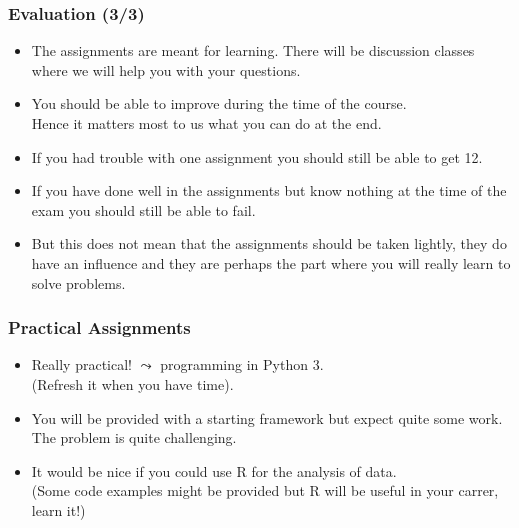 \documentclass[handout,usepdftitle=false,aspectratio=169,smaller,compress,sans,fleqn,xcolor=dvipsnames,fleqn,table]{beamer}
\begin{document}
\begin{frame}%
  \frametitle{Evaluation (3/3)}
  
\begin{itemize}\itemsep=3ex
    \item The assignments are meant for learning. There will be
      discussion classes where we will help you with your questions.
    \item You should be able to improve during the time of the course.\\
Hence it matters most to us what you can do at the end.
\item If you had trouble with one assignment you should still be able to get 12.
\item If you have done well in the assignments but know nothing at the
  time of the exam you should still be able to fail.
\item But this does not mean that the assignments should be taken
  lightly, they do have an influence and they are perhaps the part where
  you will really learn to solve problems.
\end{itemize}
\end{frame}

\begin{frame}%
  \frametitle{Practical Assignments}

  \medskip\begin{itemize}\itemsep=3ex
    \item  Really practical! $\leadsto$ programming in Python 3.\\
 (Refresh it when you have time).

\item You will be provided with a starting framework but expect quite
  some work. The problem is quite challenging.


\item It would be nice if you could use R for the analysis of
  data.\\ (Some code examples might be provided but R will be useful in
  your carrer, learn it!)
 
\end{itemize}
\end{frame}
\end{document}
